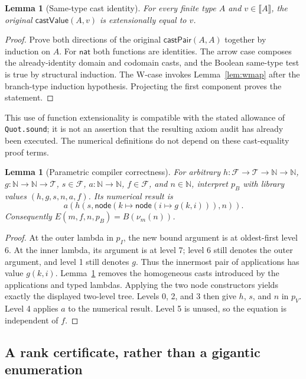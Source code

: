 \documentclass[11pt,letterpaper]{article}
\newtheorem{lemma}[theorem]{Lemma}
\theoremstyle{definition}
\newcommand{\N}{\mathbb N}
\newcommand{\Tree}{\mathcal T}
\newcommand{\Fam}{\mathcal F}
\newcommand{\node}{\mathsf{node}}
\newcommand{\den}[1]{\llbracket #1\rrbracket}
\newcommand{\code}[1]{\nolinkurl{#1}}
\begin{document}
\begin{lemma}[Same-type cast identity]
\label{lem:cast}
For every finite type $A$ and $v\in\den A$, the original
$\mathsf{castValue}(A,v)$ is extensionally equal to $v$.
\end{lemma}
\begin{proof}
Prove both directions of the original $\mathsf{castPair}(A,A)$ together by
induction on $A$. For $\mathsf{nat}$ both functions are identities. The arrow
case composes the already-identity domain and codomain casts, and the Boolean
same-type test is true by structural induction. The W-case invokes
Lemma~\ref{lem:wmap} after the branch-type induction hypothesis. Projecting the
first component proves the statement.
\end{proof}

This use of function extensionality is compatible with the stated allowance of
\code{Quot.sound}; it is not an assertion that the resulting axiom audit has
already been executed. The numerical definitions do not depend on these
cast-equality proof terms.

\begin{lemma}[Parametric compiler correctness]
\label{lem:compiler}
For arbitrary $h:\Fam\to\Tree\to\N\to\N$, $g:\N\to\N\to\Tree$,
$s\in\Fam$, $a:\N\to\N$, $f\in\Fam$, and $n\in\N$, interpret $p_B$ with
library values $(h,g,s,n,a,f)$. Its numerical result is
\[
 a\left(h\left(s,\node(k\mapsto\node(i\mapsto g(k,i))),n\right)\right).
\]
Consequently $E(m,f,n,p_B)=B(\nu_m(n))$.
\end{lemma}
\begin{proof}
At the outer lambda in $p_I$, the new bound argument is at oldest-first level
6. At the inner lambda, its argument is at level 7; level 6 still denotes the
outer argument, and level 1 still denotes $g$. Thus the innermost pair of
applications has value $g(k,i)$. Lemma~\ref{lem:cast} removes the homogeneous
casts introduced by the applications and typed lambdas. Applying the two node
constructors yields exactly the displayed two-level tree. Levels 0, 2, and 3
then give $h$, $s$, and $n$ in $p_V$. Level 4 applies $a$ to the numerical
result. Level 5 is unused, so the equation is independent of $f$.
\end{proof}

\subsection{A rank certificate, rather than a gigantic enumeration}
\end{document}
